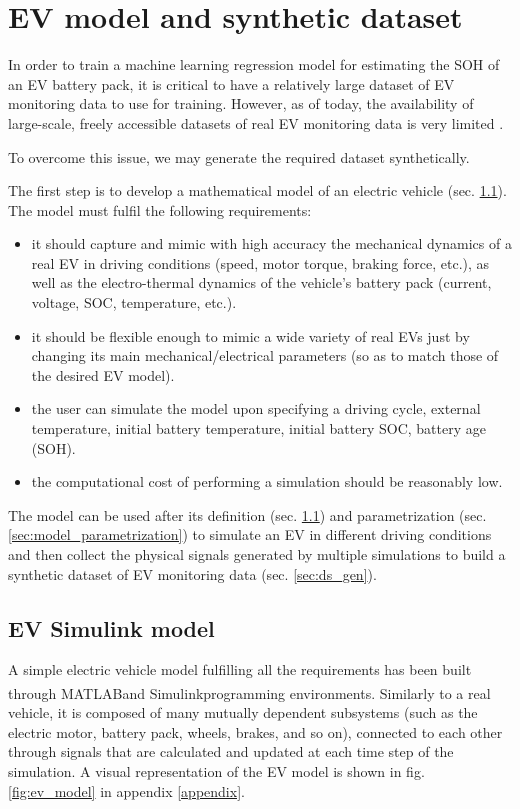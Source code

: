 \chapter{EV model and synthetic dataset}
\label{sec:ev_model_ds_gen}

In order to train a machine learning regression model for estimating the SOH of an EV battery pack, it is critical to have a relatively large dataset of EV monitoring data to use for training. However, as of today, the availability of large-scale, freely accessible datasets of real EV monitoring data is very limited \cite{ev_no_real_datasets}.

To overcome this issue, we may generate the required dataset synthetically.

The first step is to develop a mathematical model of an electric vehicle (sec. \ref{sec:ev_model}). The model must fulfil the following requirements:
\begin{itemize}
    \item it should capture and mimic with high accuracy the mechanical dynamics of a real EV in driving conditions (speed, motor torque, braking force, etc.), as well as the electro-thermal dynamics of the vehicle's battery pack (current, voltage, SOC, temperature, etc.). %
    \item it should be flexible enough to mimic a wide variety of real EVs just by changing its main mechanical/electrical parameters (so as to match those of the desired EV model). %
    \item the user can simulate the model upon specifying a driving cycle, external temperature, initial battery temperature, initial battery SOC, battery age (SOH). %
    \item the computational cost of performing a simulation should be reasonably low. %
\end{itemize}

The model can be used after its definition (sec. \ref{sec:ev_model}) and parametrization (sec. \ref{sec:model_parametrization}) to simulate an EV in different driving conditions and then collect the physical signals generated by multiple simulations to build a synthetic dataset of EV monitoring data (sec. \ref{sec:ds_gen}).





\section{EV Simulink model}
\label{sec:ev_model}
A simple electric vehicle model fulfilling all the requirements has been built through MATLAB\textsuperscript\textregistered and Simulink\textsuperscript\textregistered programming environments.
Similarly to a real vehicle, it is composed of many mutually dependent subsystems (such as the electric motor, battery pack, wheels, brakes, and so on), connected to each other through signals that are calculated and updated at each time step of the simulation. A visual representation of the EV model is shown in fig. \ref{fig:ev_model} in appendix \ref{appendix}.

